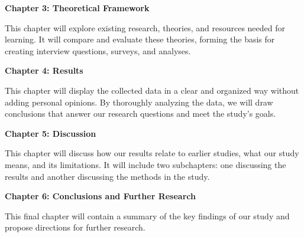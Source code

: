\textbf{Chapter 3: Theoretical Framework} 

This chapter will explore existing research, theories, and resources needed for learning. It will compare and evaluate these theories, forming the basis for creating interview questions, surveys, and analyses.  

\textbf{Chapter 4: Results}

This chapter will display the collected data in a clear and organized way without adding personal opinions. By thoroughly analyzing the data, we will draw conclusions that answer our research questions and meet the study's goals.


\textbf{Chapter 5: Discussion}


This chapter will discuss how our results relate to earlier studies, what our study means, and its limitations. It will include two subchapters: one discussing the results and another discussing the methods in the study.  

 
\textbf{Chapter 6: Conclusions and Further Research}

This final chapter will contain a summary of the key findings of our study and propose directions for further research.  